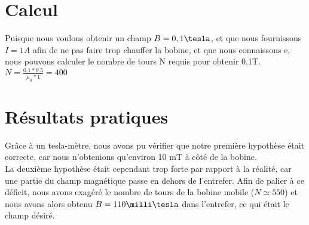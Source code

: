 \section{Calcul}
Puisque nous voulons obtenir un champ $B = 0,1 \tesla$, et que nous fournissons $I = 1 A$ afin de ne pas faire trop 
chauffer la bobine, et que nous connaissons e, nous pouvons calculer le nombre de tours N requis pour obtenir 0.1T.
$N = \frac{0.1 * 0.5}{\mu_0 * 1} = 400$
\section{Résultats pratiques}
Grâce à un tesla-mètre, nous avons pu vérifier que notre première hypothèse était correcte, car nous n'obtenions 
qu'environ 10 mT à côté de la bobine. 
\\La deuxième hypothèse était cependant trop forte par rapport à la réalité, car une 
partie du champ magnétique passe en dehors de l'entrefer. Afin de palier à ce déficit, nous avons exagéré le nombre de 
tours de la bobine mobile ($N \simeq 550$) et nous avons alors obtenu $B = 110 \milli\tesla$ dans l'entrefer, 
ce qui était le champ désiré.       
